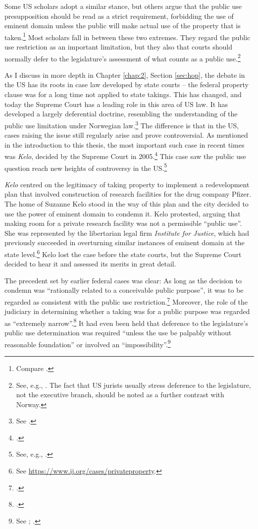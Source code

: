 Some US scholars adopt a similar stance, but others argue that the public use presupposition should be read as a strict requirement, forbidding the use of eminent domain unless the public will make actual use of the property that is taken.\footnote{Compare \cite{bell06,bell09,claeys04,sandefur06}.} Most scholars fall in between these two extremes. They regard the public use restriction as an important limitation, but they also  that courts should normally defer to the legislature's assessment of what counts as a public use.\footnote{See, e.g., \cite{merrill86,alexander05}. The fact that US jurists usually stress deference to the legislature, not the executive branch, should be noted as a further contrast with Norway.}

As I discuss in more depth in Chapter \ref{chap:2}, Section \ref{sec:hop}, the debate in the US has its roots in case law developed by state courts -- the federal property clause was for a long time not applied to state takings. This has changed, and today the Supreme Court has a leading role in this area of US law. It has developed a largely deferential doctrine, resembling the understanding of the public use limitation under Norwegian law.\footnote{See \cite{berman54,midkiff84,kelo05}.} The difference is that in the US, cases raising the issue still regularly arise and prove controversial. As mentioned in the introduction to this thesis, the most important such case in recent times was {\it Kelo}, decided by the Supreme Court in 2005.\footcite{kelo05} This case saw the public use question reach new heights of controversy in the US.\footnote{See, e.g., \cite{somin09}.}

{\it Kelo} centred on the legitimacy of taking property to implement a redevelopment plan that involved construction of research facilities for the drug company Pfizer. The home of Suzanne Kelo stood in the way of this plan and the city decided to use the power of eminent domain to condemn it. Kelo protested, arguing that making room for a private research facility was not a permissible ``public use''. She was represented by the libertarian legal firm {\it Institute for Justice}, which had previously succeeded in overturning similar instances of eminent domain at the state level.\footnote{See \url{https://www.ij.org/cases/privateproperty}.} Kelo lost the case before the state courts, but the Supreme Court decided to hear it and assessed its merits in great detail.

The precedent set by earlier federal cases was clear: As long as the decision to condemn was ``rationally related to a conceivable public purpose'', it was to be regarded as consistent with the public use restriction.\footcite[241]{midkiff84} Moreover, the role of the judiciary in determining whether a taking was for a public purpose was regarded as ``extremely narrow''.\footcite[32]{berman54} It had even been held that deference to the legislature's public use determination was required ``unless the use be palpably without reasonable foundation'' or involved an ``impossibility''.\footnote{See \cite[66]{dominion25}; \cite[680]{gettysburg96}.}

